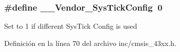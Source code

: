 \subsubsection[{\texorpdfstring{\+\_\+\+\_\+\+Vendor\+\_\+\+Sys\+Tick\+Config}{__Vendor_SysTickConfig}}]{\setlength{\rightskip}{0pt plus 5cm}\#define \+\_\+\+\_\+\+Vendor\+\_\+\+Sys\+Tick\+Config~0}\hypertarget{group___c_m_s_i_s__43_x_x___c_o_m_m_o_n_gab58771b4ec03f9bdddc84770f7c95c68}{}\label{group___c_m_s_i_s__43_x_x___c_o_m_m_o_n_gab58771b4ec03f9bdddc84770f7c95c68}
Set to 1 if different Sys\+Tick Config is used 

Definición en la línea 70 del archivo inc/cmsis\+\_\+43xx.\+h.

